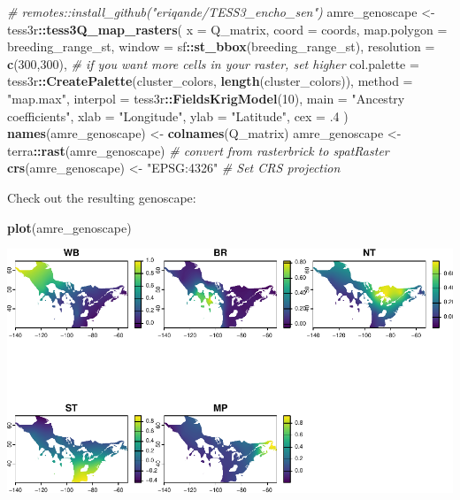 \documentclass[
]{book}
\newenvironment{Shaded}{\begin{snugshade}}{\end{snugshade}}
\newcommand{\AttributeTok}[1]{\textcolor[rgb]{0.13,0.29,0.53}{#1}}
\newcommand{\CommentTok}[1]{\textcolor[rgb]{0.56,0.35,0.01}{\textit{#1}}}
\newcommand{\DecValTok}[1]{\textcolor[rgb]{0.00,0.00,0.81}{#1}}
\newcommand{\FunctionTok}[1]{\textcolor[rgb]{0.13,0.29,0.53}{\textbf{#1}}}
\newcommand{\NormalTok}[1]{#1}
\newcommand{\OtherTok}[1]{\textcolor[rgb]{0.56,0.35,0.01}{#1}}
\newcommand{\SpecialCharTok}[1]{\textcolor[rgb]{0.81,0.36,0.00}{\textbf{#1}}}
\newcommand{\StringTok}[1]{\textcolor[rgb]{0.31,0.60,0.02}{#1}}
\begin{document}
\begin{Shaded}
\begin{Highlighting}[]
\CommentTok{\# remotes::install\_github("eriqande/TESS3\_encho\_sen")}
\NormalTok{amre\_genoscape }\OtherTok{\textless{}{-}}\NormalTok{ tess3r}\SpecialCharTok{::}\FunctionTok{tess3Q\_map\_rasters}\NormalTok{(}
  \AttributeTok{x =}\NormalTok{ Q\_matrix,}
  \AttributeTok{coord =}\NormalTok{ coords,}
  \AttributeTok{map.polygon =}\NormalTok{ breeding\_range\_st,}
  \AttributeTok{window =}\NormalTok{ sf}\SpecialCharTok{::}\FunctionTok{st\_bbox}\NormalTok{(breeding\_range\_st),}
  \AttributeTok{resolution =} \FunctionTok{c}\NormalTok{(}\DecValTok{300}\NormalTok{,}\DecValTok{300}\NormalTok{), }\CommentTok{\# if you want more cells in your raster, set higher}
  \AttributeTok{col.palette =}\NormalTok{ tess3r}\SpecialCharTok{::}\FunctionTok{CreatePalette}\NormalTok{(cluster\_colors, }\FunctionTok{length}\NormalTok{(cluster\_colors)), }
  \AttributeTok{method =} \StringTok{"map.max"}\NormalTok{, }
  \AttributeTok{interpol =}\NormalTok{ tess3r}\SpecialCharTok{::}\FunctionTok{FieldsKrigModel}\NormalTok{(}\DecValTok{10}\NormalTok{),  }
  \AttributeTok{main =} \StringTok{"Ancestry coefficients"}\NormalTok{,}
  \AttributeTok{xlab =} \StringTok{"Longitude"}\NormalTok{, }
  \AttributeTok{ylab =} \StringTok{"Latitude"}\NormalTok{, }
  \AttributeTok{cex =}\NormalTok{ .}\DecValTok{4}
\NormalTok{)}
\FunctionTok{names}\NormalTok{(amre\_genoscape) }\OtherTok{\textless{}{-}} \FunctionTok{colnames}\NormalTok{(Q\_matrix)}
\NormalTok{amre\_genoscape }\OtherTok{\textless{}{-}}\NormalTok{ terra}\SpecialCharTok{::}\FunctionTok{rast}\NormalTok{(amre\_genoscape) }\CommentTok{\# convert from rasterbrick to spatRaster}
\FunctionTok{crs}\NormalTok{(amre\_genoscape) }\OtherTok{\textless{}{-}} \StringTok{"EPSG:4326"} \CommentTok{\# Set CRS projection}
\end{Highlighting}
\end{Shaded}

Check out the resulting genoscape:

\begin{Shaded}
\begin{Highlighting}[]
\FunctionTok{plot}\NormalTok{(amre\_genoscape)}
\end{Highlighting}
\end{Shaded}

\includegraphics{Mignette_files/figure-latex/unnamed-chunk-25-1.pdf}
\end{document}
